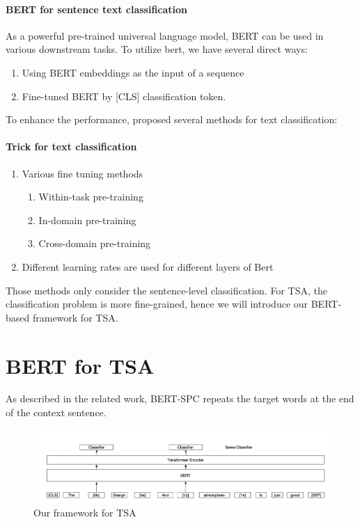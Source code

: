 \documentclass[fyp]{socreport}
\begin{document}
\paragraph{BERT for sentence text classification}


As a powerful pre-trained universal language model, BERT can be used in various downstream tasks.
To utilize bert, we have several direct ways:
\begin{enumerate}
    \item Using BERT embeddings as the input of a sequence
    \item Fine-tuned BERT by [CLS] classification token.
\end{enumerate}

To enhance the performance, \cite{sun2019finetune} proposed several methods for text classification: 


\paragraph{Trick for text classification}

\begin{enumerate}
    \item Various fine tuning methods
    \begin{enumerate}
        \item Within-task pre-training
        \item In-domain pre-training
        \item Cross-domain pre-training
    \end{enumerate}
    
    \item Different learning rates are used for different layers of Bert
\end{enumerate}


Those methods only consider the sentence-level classification. For TSA, the classification problem is more fine-grained, hence we will introduce our BERT-based framework for TSA.


\section{BERT for TSA}

As described in the related work, BERT-SPC \cite{Song2019} repeats the target words at the end of the context sentence. 

\begin{figure}[h]
    \centering
    \includegraphics[width=\linewidth]{./image/Framework.png}
    \caption{Our framework for TSA}
  \label{Framework}
\end{figure}
\end{document}
